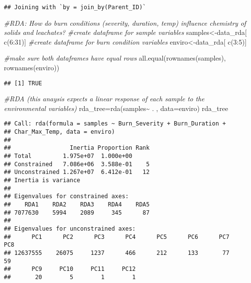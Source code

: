 \documentclass[
]{article}
\newenvironment{Shaded}{\begin{snugshade}}{\end{snugshade}}
\newcommand{\AttributeTok}[1]{\textcolor[rgb]{0.77,0.63,0.00}{#1}}
\newcommand{\CommentTok}[1]{\textcolor[rgb]{0.56,0.35,0.01}{\textit{#1}}}
\newcommand{\DecValTok}[1]{\textcolor[rgb]{0.00,0.00,0.81}{#1}}
\newcommand{\FunctionTok}[1]{\textcolor[rgb]{0.00,0.00,0.00}{#1}}
\newcommand{\NormalTok}[1]{#1}
\newcommand{\OtherTok}[1]{\textcolor[rgb]{0.56,0.35,0.01}{#1}}
\newcommand{\SpecialCharTok}[1]{\textcolor[rgb]{0.00,0.00,0.00}{#1}}
\begin{document}
\begin{verbatim}
## Joining with `by = join_by(Parent_ID)`
\end{verbatim}

\begin{Shaded}
\begin{Highlighting}[]
\CommentTok{\#RDA: How do burn conditions (severity, duration, temp) influence chemistry of solids and leachates?}
\CommentTok{\#create dataframe for sample variables}
\NormalTok{samples}\OtherTok{\textless{}{-}}\NormalTok{data\_rda[ }\FunctionTok{c}\NormalTok{(}\DecValTok{6}\SpecialCharTok{:}\DecValTok{31}\NormalTok{)]}
\CommentTok{\#create dataframe for burn condition variables}
\NormalTok{enviro}\OtherTok{\textless{}{-}}\NormalTok{data\_rda[ }\FunctionTok{c}\NormalTok{(}\DecValTok{3}\SpecialCharTok{:}\DecValTok{5}\NormalTok{)]}

\CommentTok{\#make sure both dataframes have equal rows}
\FunctionTok{all.equal}\NormalTok{(}\FunctionTok{rownames}\NormalTok{(samples), }\FunctionTok{rownames}\NormalTok{(enviro))}
\end{Highlighting}
\end{Shaded}

\begin{verbatim}
## [1] TRUE
\end{verbatim}

\begin{Shaded}
\begin{Highlighting}[]
\CommentTok{\#RDA (this anaysis expects a linear response of each sample to the environmental variables)}
\NormalTok{rda\_tree}\OtherTok{=}\FunctionTok{rda}\NormalTok{(samples}\SpecialCharTok{\textasciitilde{}}\NormalTok{ . , }\AttributeTok{data=}\NormalTok{enviro)}
\NormalTok{rda\_tree}
\end{Highlighting}
\end{Shaded}

\begin{verbatim}
## Call: rda(formula = samples ~ Burn_Severity + Burn_Duration +
## Char_Max_Temp, data = enviro)
## 
##                 Inertia Proportion Rank
## Total         1.975e+07  1.000e+00     
## Constrained   7.086e+06  3.588e-01    5
## Unconstrained 1.267e+07  6.412e-01   12
## Inertia is variance 
## 
## Eigenvalues for constrained axes:
##    RDA1    RDA2    RDA3    RDA4    RDA5 
## 7077630    5994    2089     345      87 
## 
## Eigenvalues for unconstrained axes:
##      PC1      PC2      PC3      PC4      PC5      PC6      PC7      PC8 
## 12637555    26075     1237      466      212      133       77       59 
##      PC9     PC10     PC11     PC12 
##       20        5        1        1
\end{verbatim}
\end{document}
